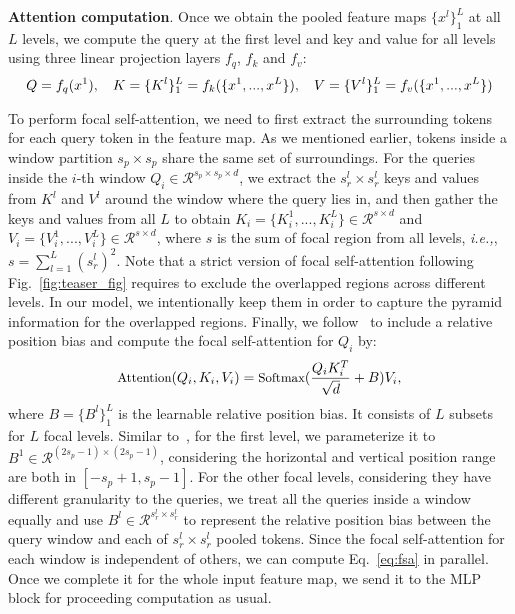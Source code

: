 \documentclass{article}
\begin{document}
\textbf{Attention computation}. Once we obtain the pooled feature maps $\{x^l\}_1^{L}$ at all $L$ levels, we compute the query at the first level and key and value for all levels using three linear projection layers $f_q$, $f_k$ and $f_v$:
\begin{equation}
\small
    Q = f_q(x^1), \quad K = \{K^l\}_1^L =  f_k(\{x^1,...,x^L\}), \quad V = \{V^l\}_1^L = f_v(\{x^1,...,x^L\})
\end{equation}

To perform focal self-attention, we need to first extract the surrounding tokens for each query token in the feature map. As we mentioned earlier, tokens inside a window partition $s_p \times s_p$ share the same set of surroundings. For the queries inside the $i$-th window $Q_i \in \mathcal{R}^{s_p \times s_p \times d}$, we extract the $s_r^l \times s_r^l$ keys and values from $K^l$ and $V^l$ around the window where the query lies in, and then gather the keys and values from all $L$ to obtain $K_i = \{K_i^1, ..., K_i^L\} \in \mathcal{R}^{s \times d}$ and $V_i = \{V_i^1, ..., V_i^L\} \in \mathcal{R}^{s \times d}$, where $s$ is the sum of focal region from all levels, \textit{i.e.,}, $s=\sum_{l=1}^{L} (s_r^l)^2$. Note that a strict version of focal self-attention following Fig.~\ref{fig:teaser_fig} requires to exclude the overlapped regions across different levels. In our model, we intentionally keep them in order to capture the pyramid information for the overlapped regions. Finally, we follow~\cite{liu2021swin} to include a relative position bias and compute the focal self-attention for $Q_i$ by:
\begin{equation}
\small
    \text{Attention}(Q_i, K_i, V_i) = \text{Softmax}(\frac{Q_i K_i^T}{\sqrt{d}} + B)V_i,
    \label{eq:fsa}
\end{equation}
where $B = \{B^l\}_1^L$ is the learnable relative position bias. It consists of $L$ subsets for $L$ focal levels. Similar to~\cite{liu2021swin}, for the first level, we parameterize it to $B^1 \in \mathcal{R}^{(2s_p-1) \times (2s_p-1)}$, considering the horizontal and vertical position range are both in $[-s_p+1, s_p-1]$. For the other focal levels, considering they have different granularity to the queries, we treat all the queries inside a window equally and use $B^l \in \mathcal{R}^{s_r^l \times s_r^l}$ to represent the relative position bias between the query window and each of $s_r^l \times s_r^l$ pooled tokens. Since the focal self-attention for each window is independent of others, we can compute Eq.~\eqref{eq:fsa} in parallel. Once we complete it for the whole input feature map, we send it to the MLP block for proceeding computation as usual.
\end{document}
